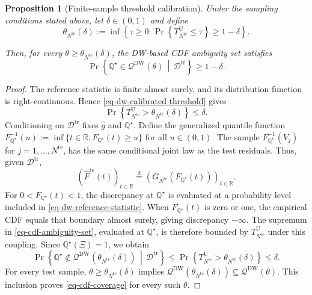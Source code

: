 \documentclass[review,11pt,3p,authoryear,nopreprintline]{elsarticle}
\newtheorem{proposition}{Proposition}
\begin{document}
\begin{proposition}[Finite-sample threshold calibration]
  \label{proposition-01}
  Under the sampling conditions stated above, let $\delta\in(0,1)$ and define
  \begin{equation}
    \theta_{N^{\mathrm{te}}}(\delta):=\inf\left\{\tau\ge0:\Pr\left\{T_{N^{\mathrm{te}}}^{\mathrm U}\le\tau\right\}\ge1-\delta\right\}.
    \label{eq-dw-calibrated-threshold}
  \end{equation}

  Then, for every $\theta\ge\theta_{N^{\mathrm{te}}}(\delta)$, the DW-based CDF ambiguity set satisfies
  \begin{equation}
    \Pr\left\{\mathbb Q^\star\in\mathcal Q^{\mathrm{DW}}(\theta)\,\middle|\,\mathcal D^{\mathrm{tr}}\right\}\ge1-\delta.
    \label{eq-cdf-coverage}
  \end{equation}
\end{proposition}
\begin{proof}
  The reference statistic is finite almost surely, and its distribution function is right-continuous. Hence \eqref{eq-dw-calibrated-threshold} gives
  \[
    \Pr\left\{T_{N^{\mathrm{te}}}^{\mathrm U}>\theta_{N^{\mathrm{te}}}(\delta)\right\}\le\delta.
  \]
  Conditioning on $\mathcal D^{\mathrm{tr}}$ fixes $\hat g$ and $\mathbb Q^\star$. Define the generalized quantile function $F_{\mathbb Q^\star}^{-1}(u):=\inf\{t\in\mathbb R:F_{\mathbb Q^\star}(t)\ge u\}$ for all $u\in(0,1)$. The sample $F_{\mathbb Q^\star}^{-1}(V_j)$ for $j=1,\ldots,N^{\mathrm{te}}$, has the same conditional joint law as the test residuals. Thus, given $\mathcal D^{\mathrm{tr}}$,
  \[
    \left(\widehat F^{\mathrm{te}}(t)\right)_{t\in\mathbb R}\overset{\mathrm d}{=}\left(G_{N^{\mathrm{te}}}\!\left(F_{\mathbb Q^\star}(t)\right)\right)_{t\in\mathbb R}.
  \]
  For $0<F_{\mathbb Q^\star}(t)<1$, the discrepancy at $\mathbb Q^\star$ is evaluated at a probability level included in \eqref{eq-dw-reference-statistic}. When $F_{\mathbb Q^\star}(t)$ is zero or one, the empirical CDF equals that boundary almost surely, giving discrepancy $-\infty$. The supremum in \eqref{eq-cdf-ambiguity-set}, evaluated at $\mathbb Q^\star$, is therefore bounded by $T_{N^{\mathrm{te}}}^{\mathrm U}$ under this coupling. Since $\mathbb Q^\star(\Xi)=1$, we obtain
  \[
    \Pr\left\{\mathbb Q^\star\notin\mathcal Q^{\mathrm{DW}}\!\left(\theta_{N^{\mathrm{te}}}(\delta)\right)\,\middle|\,\mathcal D^{\mathrm{tr}}\right\}
    \le\Pr\left\{T_{N^{\mathrm{te}}}^{\mathrm U}>\theta_{N^{\mathrm{te}}}(\delta)\right\}\le\delta.
  \]
  For every test sample, $\theta\ge\theta_{N^{\mathrm{te}}}(\delta)$ implies $\mathcal Q^{\mathrm{DW}}\!\left(\theta_{N^{\mathrm{te}}}(\delta)\right)\subseteq\mathcal Q^{\mathrm{DW}}(\theta)$. This inclusion proves \eqref{eq-cdf-coverage} for every such $\theta$.
\end{proof}
\end{document}
